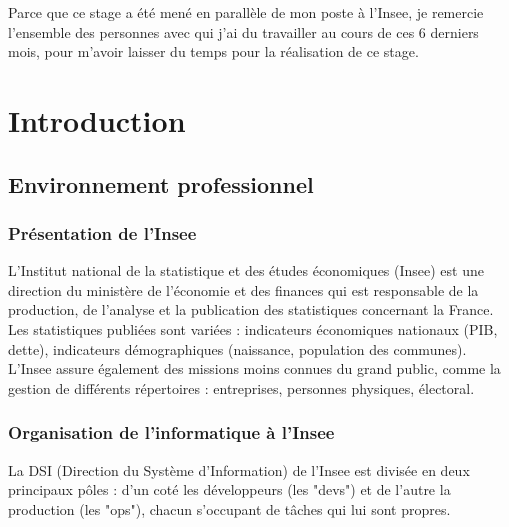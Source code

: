 \documentclass[11pt,fleqn]{book} %
\begin{document}
Parce que ce stage a été mené en parallèle de mon poste à l’Insee, je remercie l'ensemble des personnes avec qui j'ai du travailler au cours de ces 6 derniers mois, pour m'avoir laisser du temps pour la réalisation de ce stage.\newline




\vspace{-3cm}
\tableofcontents %
\cleardoublepage %

\pagestyle{fancy} %


\mainmatter
\part{\color{ocre}Introduction}
\chapter{Environnement professionnel}
\vspace{-2cm}
\section{Présentation de l'Insee}
L’Institut national de la statistique et des études économiques (Insee) est une direction du ministère de l'économie et des finances qui est responsable de la production, de l'analyse et la publication des statistiques concernant la France. Les statistiques publiées sont variées : indicateurs économiques nationaux (PIB, dette), indicateurs démographiques (naissance, population des communes). L'Insee assure également des missions moins connues du grand public, comme la gestion de différents répertoires : entreprises, personnes physiques, électoral.
\section{Organisation de l'informatique à l'Insee}
La DSI (Direction du Système d'Information) de l’Insee est divisée en deux principaux pôles :  d'un coté les développeurs (les "devs") et de l'autre la production (les "ops"), chacun s'occupant de tâches qui lui sont propres.\\
\end{document}
